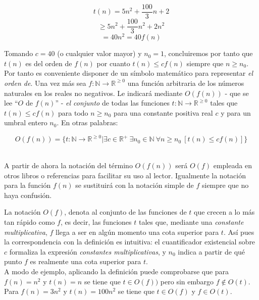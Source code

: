\begin{center}
\[ t(n) = 5n^2 + \frac{100}{3}n + 2 \]
\[ \geq 5n^2 + \frac{100}{3}n^2 + 2n^2 \]
\[ = 40n^2 = 40 f(n) \]
\end{center}

Tomando $c = 40$ (o cualquier valor mayor) y $n_0 = 1$, concluiremos por tanto que $t(n)$ es del orden de $f(n)$ por cuanto $t(n) \leq cf(n)$ siempre que $n \geq n_0$. Por tanto es conveniente disponer de un símbolo matemático para representar \emph{el orden de}. Una vez más sea $f: \mathbb{N} \rightarrow \mathbb{R}^{\geq 0}$ una función arbitraria de los números naturales en los reales no negativos. Le indicará mediante $O(f(n))$ - que se lee ``$O$ de $f(n)$'' - \emph{el conjunto} de todas las funciones $t: \mathbb{N} \rightarrow \mathbb{R}^{\geq 0}$ tales que $t(n) \leq cf(n)$ para todo $n \geq n_0$ para una constante positiva real $c$ y para un umbral entero $n_0$. En otras palabras:
\begin{center}
\[ O(f(n)) = \big\{ t: \mathbb{N} \rightarrow \mathbb{R}^{\geq 0} \big| \exists c \in \mathbb{R}^+\ \exists n_0 \in \mathbb{N}\ \forall n \geq n_0\ [t(n) \leq cf(n)] \big\} \]\\
\end{center}

\begin{nota}
A partir de ahora la notación del término $O(f(n))$ será $O(f)$ empleada en otros libros o referencias para facilitar su uso al lector. Igualmente la notación para la función $f(n)$ se sustituirá con la notación simple de $f$ siempre que no haya confusión.\\
\end{nota}

La notación $O(f)$, denota al conjunto de las funciones de $t$ que crecen a lo más tan rápido como $f$, es decir, las funciones $t$ tales que, mediante una \emph{constante multiplicativa}, $f$ llega a ser en algún momento una cota superior para $t$. Así pues la correspondencia con la definición es intuitiva: el cuantificador existencial sobre $c$ formaliza la expresión \emph{constantes multiplicativas}, y $n_0$ indica a partir de qué punto $f$ es realmente una cota superior para $t$.\\

A modo de ejemplo, aplicando la definición puede comprobarse que para $f(n) = n^2$ y $t(n) = n$ se tiene que $t \in O(f))$ pero sin embargo $f \notin O(t)$. Para $f(n) = 3n^2$ y $t(n) = 100n^2$ se tiene que $t \in O(f)$ y $f \in O(t)$.\\

